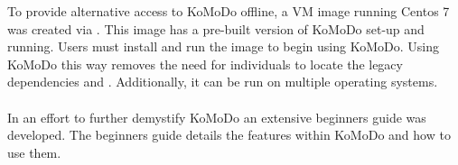   To provide alternative access to KoMoDo offline, a VM image running Centos 7 was created via . This image has a pre-built version of KoMoDo set-up and running. Users must install  and run the image to begin using KoMoDo. Using KoMoDo this way removes the need for individuals to locate the legacy dependencies  and . Additionally, it can be run on multiple operating systems.\\\\
  In an effort to further demystify KoMoDo an extensive beginners guide was developed. The beginners guide details the features within KoMoDo and how to use them.

